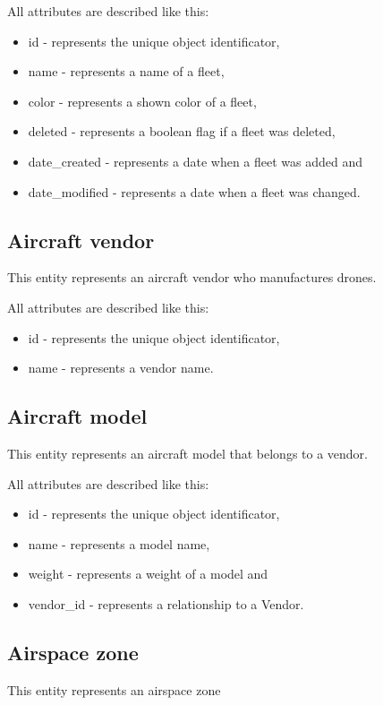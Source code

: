 All attributes are described like this:
\begin{itemize}
    \item id - represents the unique object identificator,
    \item name - represents a name of a fleet,
    \item color - represents a shown color of a fleet,
    \item deleted - represents a boolean flag if a fleet was deleted,
    \item date\_created - represents a date when a fleet was added and
    \item date\_modified - represents a date when a fleet was changed.
\end{itemize}

\subsection{Aircraft vendor}\label{subsec:aircraft-vendor}
This entity represents an aircraft vendor who manufactures drones.

All attributes are described like this:
\begin{itemize}
    \item id - represents the unique object identificator,
    \item name - represents a vendor name.
\end{itemize}

\subsection{Aircraft model}\label{subsec:aircraft-model}
This entity represents an aircraft model that belongs to a vendor.

All attributes are described like this:
\begin{itemize}
    \item id - represents the unique object identificator,
    \item name - represents a model name,
    \item weight - represents a weight of a model and
    \item vendor\_id - represents a relationship to a Vendor.
\end{itemize}

\subsection{Airspace zone}\label{subsec:airspace-zone}
This entity represents an airspace zone

